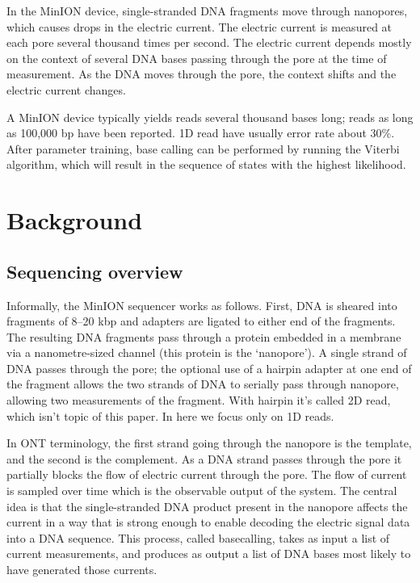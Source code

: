 \documentclass[times, utf8, seminar, numeric]{fer}
\begin{document}
In the MinION device, single-stranded DNA fragments move through nanopores, which causes drops in the electric current. The electric current is measured at each pore several thousand times per second. The electric current depends mostly on the context of several DNA bases passing through the pore at the time of measurement. As the DNA moves through the pore, the context shifts and the electric current changes.

A MinION device typically yields reads several thousand bases long; reads as long as 100,000 bp have been reported. 1D read have usually error rate about   30\%. After parameter training, base calling can be performed by running the Viterbi algorithm, which will result in the sequence of states with the highest likelihood.

\chapter{Background}

\section{Sequencing overview}
Informally, the MinION sequencer works as follows. First, DNA is sheared into fragments of 8–20 kbp and adapters are ligated to either end of the fragments. The resulting DNA fragments pass through a protein embedded in a membrane via a nanometre-sized channel (this protein is the `nanopore'). A single strand of DNA passes through the pore; the optional use of a hairpin adapter at one end of the fragment allows the two strands of DNA to serially pass through nanopore, allowing two measurements of the fragment. With hairpin it's called 2D read, which isn't topic of this paper. In here we focus only on 1D reads.

In ONT terminology, the first strand going through the nanopore is the template, and the second is the complement. As a DNA strand passes through the pore it partially blocks the flow of electric current through the pore. The flow of current is sampled over time which is the observable output of the system. The central idea is that the single-stranded DNA product present in the nanopore affects the current in a way that is strong enough to enable decoding the electric signal data into a DNA sequence. This process, called basecalling, takes as input a list of current measurements, and produces as output a list of DNA bases most likely to have generated those currents.
\end{document}

